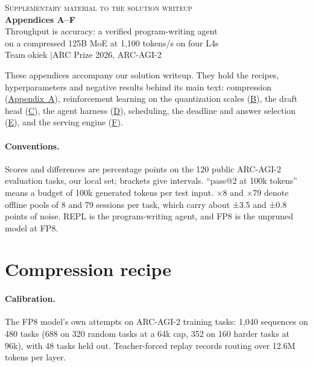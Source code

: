 \documentclass[10pt]{article}
\begin{document}
\thispagestyle{plain}
\color{ink}

\begin{center}
  {\small\scshape\color{muted} Supplementary material to the solution writeup}\\[6pt]
  {\LARGE\bfseries Appendices A--F}\\[8pt]
  {\large Throughput is accuracy: a verified program-writing agent\\ on a compressed 125B MoE at 1,100 tokens/s on four L4s}\\[8pt]
  {\normalsize Team okiek \quad\textcolor{muted}{|}\quad ARC Prize 2026, ARC-AGI-2}
\end{center}
\vspace{4pt}

These appendices accompany our solution writeup. They hold the recipes, hyperparameters and negative results behind
its main text: compression (\hyperref[app:compression]{Appendix~A}), reinforcement learning on the quantization scales
(\hyperref[app:rl]{B}), the draft head (\hyperref[app:draft]{C}), the agent harness (\hyperref[app:harness]{D}),
scheduling, the deadline and answer selection (\hyperref[app:scheduling]{E}), and the serving engine
(\hyperref[app:engine]{F}).

\paragraph{Conventions.} Scores and differences are percentage points on the 120 public ARC-AGI-2 evaluation tasks,
our local set; brackets give intervals. ``pass@2 at 100k tokens'' means a budget of 100k generated tokens per test
input. ×8 and ×79 denote offline pools of 8 and 79 sessions per task, which carry about ±3.5 and ±0.8 points of noise.
REPL is the program-writing agent, and FP8 is the unpruned model at FP8.

\appendix
{}

\section{Compression recipe}\label{app:compression}

\paragraph{Calibration.} The FP8 model's own attempts on ARC-AGI-2 training tasks: 1,040 sequences on 480 tasks (688 on
320 random tasks at a 64k cap, 352 on 160 harder tasks at 96k), with 48 tasks held out. Teacher-forced replay records
routing over 12.6M tokens per layer.
\end{document}
